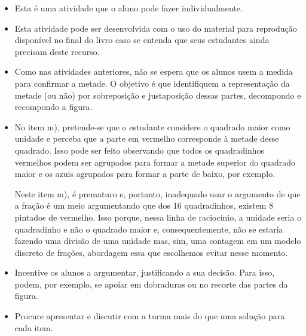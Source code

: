    \vspace{.1cm}

\begin{itemize} %
\item       Esta é uma atividade que o aluno pode fazer individualmente.
\item Esta atividade pode ser desenvolvida com o uso do material para reprodução disponível no final do livro caso se entenda que seus estudantes ainda precisam deste recurso.
\item Como nas atividades anteriores, não se espera que os alunos usem a medida para confirmar a metade. O objetivo é que identifiquem a representação da metade (ou não) por sobreposição e justaposição dessas partes, decompondo e recompondo a figura.
\item No item m), pretende-se que o estudante considere o quadrado maior como unidade e perceba que a parte em vermelho corresponde à metade desse quadrado. Isso pode ser feito observando que todos os quadradinhos vermelhos podem ser agrupados para formar a metade superior do quadrado maior e os azuis agrupados para formar a parte de baixo, por exemplo.
\begin{center}
\quad
{}
\end{center}

Neste item m), é prematuro e, portanto, inadequado usar o argumento de que a fração é um meio argumentando que dos 16 quadradinhos, existem 8 pintados de vermelho. Isso porque, nessa linha de raciocínio, a unidade seria o quadradinho e não o quadrado maior e, consequentemente, não se estaria fazendo uma divisão de uma unidade mas, sim, uma contagem em um modelo discreto de frações, abordagem essa que escolhemos evitar nesse momento.   


\item Incentive os alunos a argumentar, justificando a sua decisão. Para isso, podem, por exemplo, se apoiar em dobraduras ou no recorte das partes da figura.
\item Procure apresentar e discutir com a turma mais do que uma solução para cada item.
\end{itemize} %


